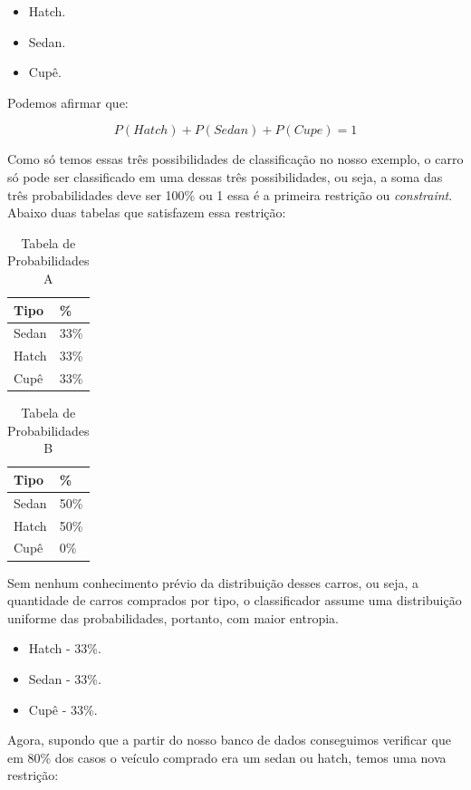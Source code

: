 \begin{itemize}
  \item Hatch.
  \item Sedan.
  \item Cupê.
\end{itemize}

Podemos afirmar que:

\[ P(Hatch) + P (Sedan) + P(Cupe) = 1 \]

Como só temos essas três possibilidades de classificação no nosso
exemplo, o carro só pode ser classificado em uma dessas três possibilidades, ou
seja, a soma das três probabilidades deve ser 100\% ou 1 essa é a primeira
restrição ou \textit{constraint}. Abaixo duas tabelas que satisfazem essa
restrição:

\begin{table}[htb]
\centering
\begin{tabular}{|l|l|}
\hline
Tipo  & \%   \\ \hline
Sedan & 33\% \\ \hline
Hatch & 33\% \\ \hline
Cupê  & 33\% \\ \hline
 \end{tabular}
\caption{Tabela de Probabilidades A} 
\end{table}
\begin{table}[htb]
\centering
 \begin{tabular}{|l|l|}
\hline
Tipo  & \%   \\ \hline
Sedan & 50\% \\ \hline
Hatch & 50\% \\ \hline
Cupê  & 0\% \\ \hline
 \end{tabular}  
\caption{Tabela de Probabilidades B} 
\end{table}

Sem nenhum conhecimento prévio da distribuição desses carros, ou seja, a
quantidade de carros comprados por tipo, o classificador assume uma distribuição
uniforme das probabilidades, portanto, com maior entropia.

\begin{itemize}
  \item Hatch - 33\%.
  \item Sedan - 33\%.
  \item Cupê - 33\%.
\end{itemize}

Agora, supondo que a partir do nosso banco de dados conseguimos verificar que em
80\% dos casos o veículo comprado era um sedan ou hatch, temos uma nova
restrição:

